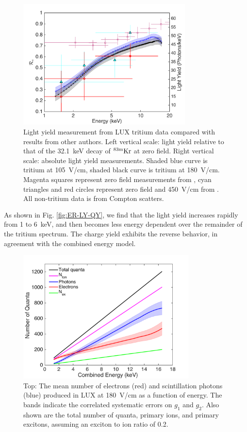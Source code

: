 \begin{figure}[h!]
\includegraphics[width=88mm]{fig/Re_LY_log.png}
\caption{Light yield measurement from LUX tritium data compared with results from other authors. Left vertical scale: light yield relative to that of the 32.1~keV decay of $\rm ^{83m}Kr $ at zero field. Right vertical scale: absolute light yield measurements. Shaded blue curve is tritium at 105~V/cm, shaded black curve is tritium at 180~V/cm. Magenta squares represent zero field measurements from \cite{Aprile_LY}, cyan triangles and red circles represent zero field and 450~V/cm from \cite{Baudis}. All non-tritium data is from Compton scatters. }
\label{fig:Re_LY}
\end{figure}


As shown in Fig. \ref{fig:ER-LY-QY}, we find that the light yield increases rapidly from 1 to 6~keV, and then becomes less energy dependent over the remainder of the tritium spectrum. The charge yield exhibits the reverse behavior, in agreement with the combined energy model. 

\begin{figure}[h!]
\includegraphics[width=90mm]{fig/quanta-vs-energy.png}
\caption{Top: The mean number of electrons (red) and scintillation photons (blue) produced in LUX at 180~V/cm as a function of energy. The bands indicate the correlated systematic errors on $g_1$ and $g_2$. Also shown are the total number of quanta, primary ions, and primary excitons, assuming an exciton to ion ratio of 0.2. }
\label{fig:quanta-vs-energy}
\end{figure}

